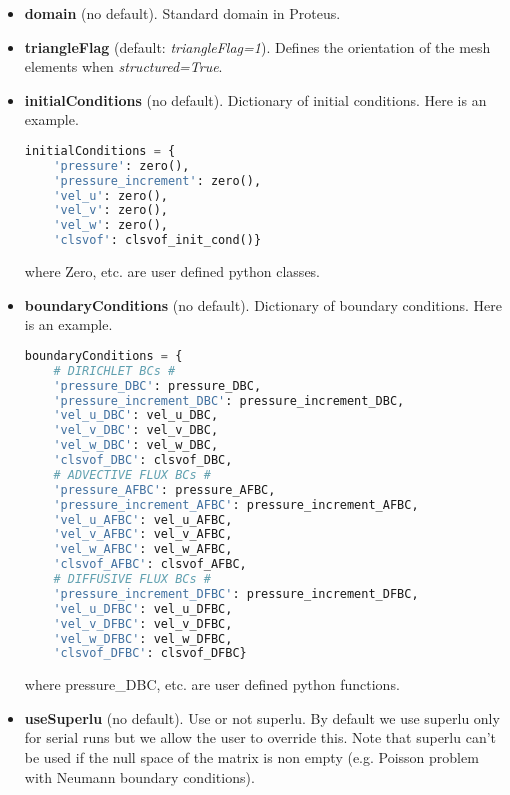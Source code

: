 \documentclass[english,11pt]{article}
\begin{document}
\begin{itemize}
\item {\bf domain} (no default).
  Standard domain in Proteus.

\item {\bf triangleFlag} (default: {\it triangleFlag=1}).
  Defines the orientation of the mesh elements when {\it structured=True}.

\item {\bf initialConditions} (no default).
  Dictionary of initial conditions. Here is an example.

\begin{lstlisting}[language=python, frame=single]
  initialConditions = {
    'pressure': zero(),
    'pressure_increment': zero(),
    'vel_u': zero(),
    'vel_v': zero(),
    'vel_w': zero(),
    'clsvof': clsvof_init_cond()}
\end{lstlisting}  
where Zero, etc. are user defined python classes.

\item {\bf boundaryConditions} (no default).
  Dictionary of boundary conditions. Here is an example.
  
\begin{lstlisting}[language=python, frame=single]
  boundaryConditions = {
    # DIRICHLET BCs #
    'pressure_DBC': pressure_DBC,
    'pressure_increment_DBC': pressure_increment_DBC,
    'vel_u_DBC': vel_u_DBC,
    'vel_v_DBC': vel_v_DBC,
    'vel_w_DBC': vel_w_DBC,
    'clsvof_DBC': clsvof_DBC,
    # ADVECTIVE FLUX BCs #
    'pressure_AFBC': pressure_AFBC,
    'pressure_increment_AFBC': pressure_increment_AFBC,
    'vel_u_AFBC': vel_u_AFBC,
    'vel_v_AFBC': vel_v_AFBC,
    'vel_w_AFBC': vel_w_AFBC,
    'clsvof_AFBC': clsvof_AFBC,
    # DIFFUSIVE FLUX BCs #
    'pressure_increment_DFBC': pressure_increment_DFBC,
    'vel_u_DFBC': vel_u_DFBC,
    'vel_v_DFBC': vel_v_DFBC,
    'vel_w_DFBC': vel_w_DFBC,
    'clsvof_DFBC': clsvof_DFBC}
\end{lstlisting}  
where pressure\_DBC, etc. are user defined python functions.

\item {\bf useSuperlu} (no default).
  Use or not superlu. By default we use superlu only for serial runs but we allow
  the user to override this.  
  Note that superlu can't be used if the null space of the matrix is non empty
  (e.g. Poisson problem with Neumann boundary conditions).
  
\end{itemize}
\end{document}

